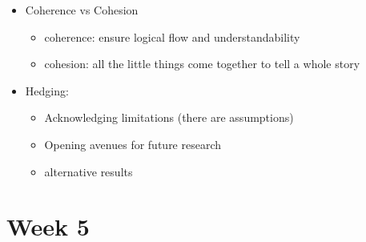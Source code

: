 \documentclass{article}
\begin{document}
\begin{multicols}{2}
\begin{itemize}
    \item Coherence vs Cohesion
    \begin{itemize}
    	\item coherence: ensure logical flow and understandability
    	\item cohesion: all the little things come together to tell a whole story
    \end{itemize}
    \item Hedging:
    \begin{itemize}
    	\item Acknowledging limitations (there are assumptions)
    	\item Opening avenues for future research
    	\item alternative results
    \end{itemize}
\end{itemize}
\section{Week 5}

\end{multicols}
\end{document}
